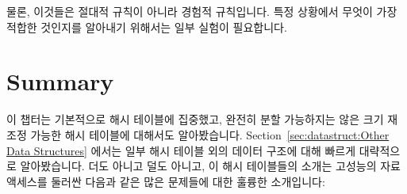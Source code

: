 물론, 이것들은 절대적 규칙이 아니라 경험적 규칙입니다.
특정 상황에서 무엇이 가장 적합한 것인지를 알아내기 위해서는 일부 실험이
필요합니다.

\section{Summary}
\label{sec:datastruct:Summary}

이 챕터는 기본적으로 해시 테이블에 집중했고, 완전히 분할 가능하지는 않은 크기
재조정 가능한 해시 테이블에 대해서도 알아봤습니다.
Section~\ref{sec:datastruct:Other Data Structures} 에서는 일부 해시 테이블 외의
데이터 구조에 대해 빠르게 대략적으로 알아봤습니다.
더도 아니고 덜도 아니고, 이 해시 테이블들의 소개는 고성능의 자료 액세스를
둘러싼 다음과 같은 많은 문제들에 대한 훌륭한 소개입니다:

